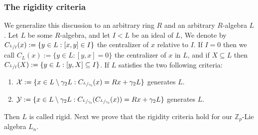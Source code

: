 \documentclass{article}
\begin{document}
\subsubsection{The rigidity criteria}
We generalize this discussion to an arbitrary ring $R$ and an arbitrary $R$-algebra $L$.
Let $L$ be some $R$-algebra, and let $I<L$ be an ideal of $L$, We denote by $C_{\sfrac{L}{I}}(x):=\{y\in{L} : [x,y]\in{I}\}$ the centralizer of $x$ relative to $I$. 
If $I=0$ then we call $C_L(x):=\{y\in{L} : [y,x]=0\}$ the centralizer of $x$ in $L$, and if $X\subseteq{L}$ then $C_{\sfrac{L}{I}}(X):=\{y\in{L} : [y,X]\subseteq{I}\}$.
If $L$ satisfies the two following criteria:
\begin{enumerate}
    \item $\mathcal{X}:=\{x\in{L}\setminus\gamma_2L : C_{\sfrac{L}{\gamma_3}}(x)=Rx+\gamma_2L\}$ generates $L$.
    \item $\mathcal{Y}:=\{x\in{L}\setminus\gamma_2L : C_{\sfrac{L}{\gamma_3}}(C_{\sfrac{L}{\gamma_3}}(x))=Rx+\gamma_2L\}$ generates $L$.
\end{enumerate}
Then $L$ is called rigid.
Next we prove that the rigidity criteria hold for our $\mathbb{Z}_p$-Lie algebra $L_n$.
\end{document}
